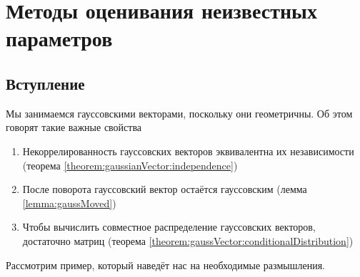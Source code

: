 \chapter{Методы оценивания неизвестных параметров}

\section{Вступление}

Мы занимаемся гауссовскими векторами, поскольку они геометричны. Об этом говорят
такие важные свойства
\begin{enumerate}
  \item Некоррелированность гауссовских векторов эквивалентна их независимости
      (теорема \ref{theorem:gaussianVector:independence})
  \item После поворота гауссовский вектор остаётся гауссовским
      (лемма \ref{lemma:gaussMoved})
  \item Чтобы вычислить совместное распределение гауссовских векторов,
      достаточно матриц
      (теорема \ref{theorem:gaussVector:conditionalDistribution})
\end{enumerate}

Рассмотрим пример, который наведёт нас на необходимые размышления.


